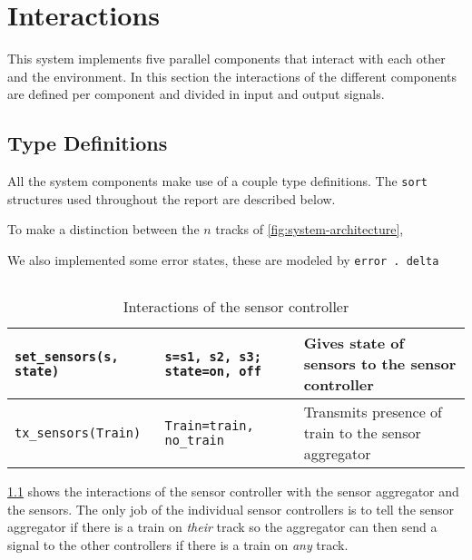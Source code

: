 \documentclass[final]{report}
\begin{document}
\chapter{Interactions}\label{ch:interactions}
This system implements five parallel components that interact with each other and the environment.
In this section the interactions of the different components are defined per component and divided in input and output signals.

\section{Type Definitions}\label{sec:interactions-typedef}
All the system components make use of a couple type definitions.
The \texttt{sort} structures used throughout the report are described below.

To make a distinction between the $n$ tracks of \cref{fig:system-architecture}, 





We also implemented some error states, these are modeled by \texttt{error . delta}




\section{}
\begin{table}[H]
\centering
    \begin{tabular}{|l|l|l|}
    \hline
    \texttt{set\_sensors(s, state)} & \texttt{s=s1, s2, s3; state=on, off}  & Gives state of sensors to the sensor controller      \\ \hline
    \texttt{tx\_sensors(Train)}     & \texttt{Train=train, no\_train}       & Transmits presence of train to the sensor aggregator \\ \hline
    \end{tabular}
    \caption{Interactions of the sensor controller}
    \label{tab:sensorSignals}
\end{table}

\cref{tab:sensorSignals} shows the interactions of the sensor controller with the sensor aggregator and the sensors.
The only job of the individual sensor controllers is to tell the sensor aggregator if there is a train on \textit{their} track so the aggregator can then send a signal to the other controllers if there is a train on \textit{any} track.
\end{document}
